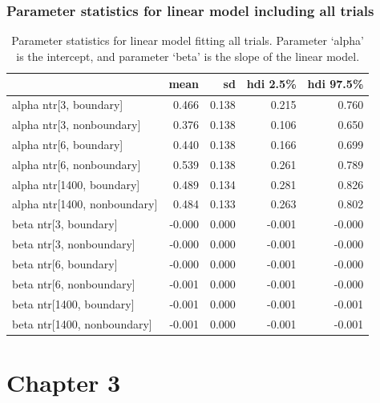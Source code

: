 \subsection*{Parameter statistics for linear model including all trials}

\begin{table}[H]
    \centering
    \begin{tabular}{lrrrr}
        \toprule
         & mean & sd & hdi 2.5\% & hdi 97.5\% \\
        \midrule
        alpha ntr[3, boundary] & 0.466 & 0.138 & 0.215 & 0.760 \\
        alpha ntr[3, nonboundary] & 0.376 & 0.138 & 0.106 & 0.650 \\
        alpha ntr[6, boundary] & 0.440 & 0.138 & 0.166 & 0.699 \\
        alpha ntr[6, nonboundary] & 0.539 & 0.138 & 0.261 & 0.789 \\
        alpha ntr[1400, boundary] & 0.489 & 0.134 & 0.281 & 0.826 \\
        alpha ntr[1400, nonboundary] & 0.484 & 0.133 & 0.263 & 0.802 \\
        beta ntr[3, boundary] & -0.000 & 0.000 & -0.001 & -0.000 \\
        beta ntr[3, nonboundary] & -0.000 & 0.000 & -0.001 & -0.000 \\
        beta ntr[6, boundary] & -0.000 & 0.000 & -0.001 & -0.000 \\
        beta ntr[6, nonboundary] & -0.001 & 0.000 & -0.001 & -0.000 \\
        beta ntr[1400, boundary] & -0.001 & 0.000 & -0.001 & -0.001 \\
        beta ntr[1400, nonboundary] & -0.001 & 0.000 & -0.001 & -0.001 \\
        \bottomrule
    \end{tabular}        
    \caption{Parameter statistics for linear model fitting all trials. Parameter `alpha' is the intercept, and parameter `beta' is the slope of the linear model.}
    \label{tab:allblocks-trial-ppt-lag}         
\end{table}

\chapter{Chapter 3}

